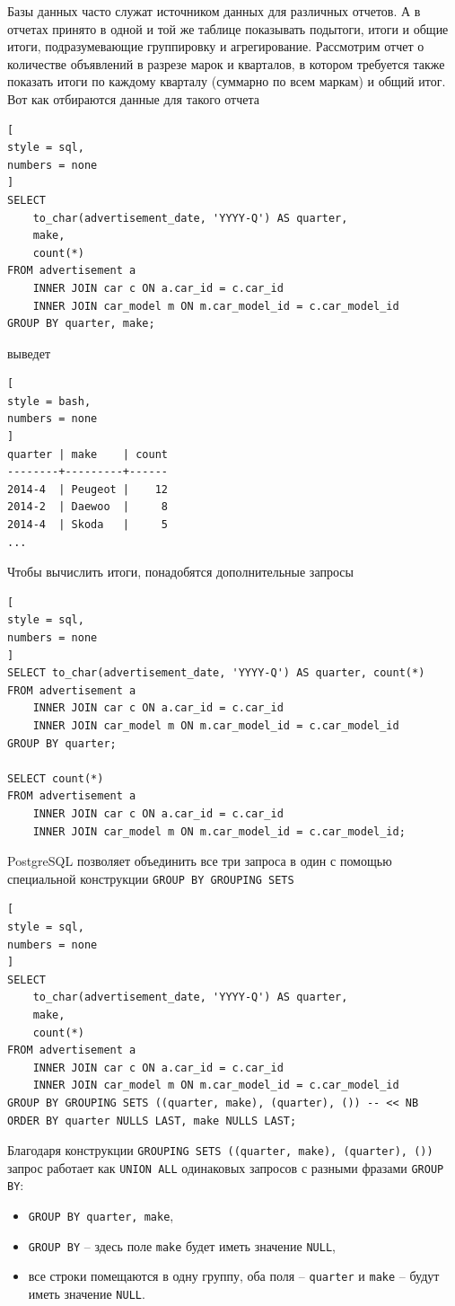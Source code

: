 \documentclass[%
	11pt,
	a4paper,
	utf8,
		]{article}
\begin{document}
Базы данных часто служат источником данных для различных отчетов. А в отчетах принято в одной и той же таблице показывать подытоги, итоги и общие итоги, подразумевающие группировку и агрегирование. Рассмотрим отчет о количестве объявлений в разрезе марок и кварталов, в котором требуется также показать итоги по каждому кварталу (суммарно по всем маркам) и общий итог. Вот как отбираются данные для такого отчета
\begin{lstlisting}[
style = sql,
numbers = none
]
SELECT
    to_char(advertisement_date, 'YYYY-Q') AS quarter,
    make,
    count(*)
FROM advertisement a
    INNER JOIN car c ON a.car_id = c.car_id
    INNER JOIN car_model m ON m.car_model_id = c.car_model_id
GROUP BY quarter, make;
\end{lstlisting}
выведет
\begin{lstlisting}[
style = bash,
numbers = none
]
quarter | make    | count
--------+---------+------
2014-4  | Peugeot |    12
2014-2  | Daewoo  |     8
2014-4  | Skoda   |     5
... 
\end{lstlisting}

Чтобы вычислить итоги, понадобятся дополнительные запросы
\begin{lstlisting}[
style = sql,
numbers = none
]
SELECT to_char(advertisement_date, 'YYYY-Q') AS quarter, count(*)
FROM advertisement a
    INNER JOIN car c ON a.car_id = c.car_id
    INNER JOIN car_model m ON m.car_model_id = c.car_model_id
GROUP BY quarter;

SELECT count(*)
FROM advertisement a
    INNER JOIN car c ON a.car_id = c.car_id
    INNER JOIN car_model m ON m.car_model_id = c.car_model_id;
\end{lstlisting}

PostgreSQL позволяет объединить все три запроса в один с помощью специальной конструкции \texttt{GROUP BY GROUPING SETS}
\begin{lstlisting}[
style = sql,
numbers = none
]
SELECT
    to_char(advertisement_date, 'YYYY-Q') AS quarter,
    make,
    count(*)
FROM advertisement a
    INNER JOIN car c ON a.car_id = c.car_id
    INNER JOIN car_model m ON m.car_model_id = c.car_model_id
GROUP BY GROUPING SETS ((quarter, make), (quarter), ()) -- << NB
ORDER BY quarter NULLS LAST, make NULLS LAST;
\end{lstlisting}

Благодаря конструкции \texttt{GROUPING SETS ((quarter, make), (quarter), ())} запрос работает как \texttt{UNION ALL} одинаковых запросов с разными фразами \texttt{GROUP BY}:
\begin{itemize}
	\item \texttt{GROUP BY quarter, make},
	
	\item \texttt{GROUP BY} -- здесь поле \texttt{make} будет иметь значение \texttt{NULL},
	
	\item все строки помещаются в одну группу, оба поля -- \texttt{quarter} и \texttt{make} -- будут иметь значение \texttt{NULL}.
\end{itemize}
\end{document}
